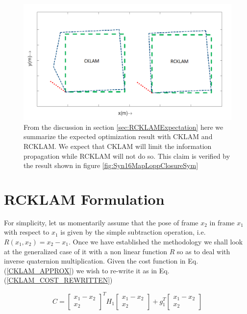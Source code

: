 \begin{figure}
	\centering
		\includegraphics[width=1.00\textwidth]{images/hypotheticalLoopClosureCklamRcklam.png}
  \caption{From the discussion in section \ref{sec:RCKLAMExpectation} here we summarize the expected optimization result with CKLAM and RCKLAM. We expect that CKLAM will limit the information propagation while RCKLAM will not do so. This claim is verified by the result shown in figure \ref{fig:Syn16MapLoppClosureSym}}
  \label{fig:hypotheticalLoopClosureCklamRcklam}
\end{figure}

 

\section{RCKLAM Formulation}
\label{sec:rcklamSimple}
For simplicity, let us momentarily assume that the pose of frame $x_2$ in frame $x_1$ with respect to $x_1$ is given by the simple  subtraction operation, i.e. $R(x_1, x_2) = x_2 - x_1$. Once we have established the methodology we shall look at the generalized case of it with a non linear function $R$ so as to deal with inverse quaternion multiplication. Given the cost function in Eq.(\ref{CKLAM_APPROX}) we wish to re-write it as in Eq.(\ref{CKLAM_COST_REWRITTEN})

\begin{equation}
	C = \begin{bmatrix} x_1-x_2 \\ x_2 \end{bmatrix} ^TH_1\begin{bmatrix} x_1-x_2 \\ x_2 \end{bmatrix} + g_1^T\begin{bmatrix} x_1-x_2 \\ x_2 \end{bmatrix}
	\label{CKLAM_COST_REWRITTEN}
\end{equation}

